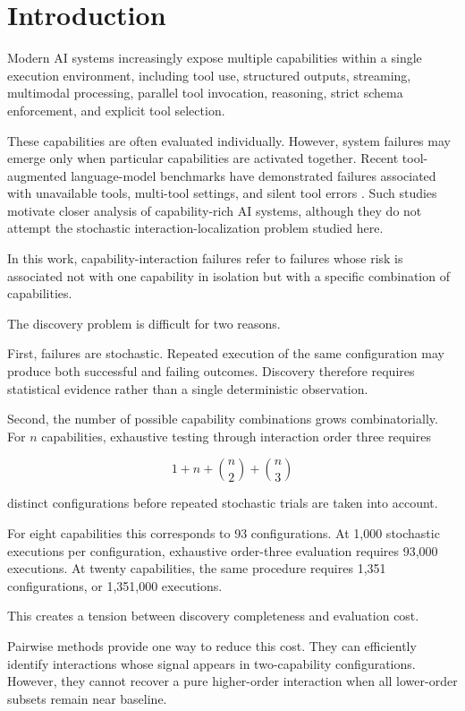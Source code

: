 \section{Introduction}

Modern AI systems increasingly expose multiple capabilities within a single execution environment, including tool use, structured outputs, streaming, multimodal processing, parallel tool invocation, reasoning, strict schema enforcement, and explicit tool selection.

These capabilities are often evaluated individually. However, system failures may emerge only when particular capabilities are activated together. Recent tool-augmented language-model benchmarks have demonstrated failures associated with unavailable tools, multi-tool settings, and silent tool errors \cite{trevino2025failtalms, sun2024toolsfail}. Such studies motivate closer analysis of capability-rich AI systems, although they do not attempt the stochastic interaction-localization problem studied here.

In this work, capability-interaction failures refer to failures whose risk is associated not with one capability in isolation but with a specific combination of capabilities.

The discovery problem is difficult for two reasons.

First, failures are stochastic. Repeated execution of the same configuration may produce both successful and failing outcomes. Discovery therefore requires statistical evidence rather than a single deterministic observation.

Second, the number of possible capability combinations grows combinatorially. For \(n\) capabilities, exhaustive testing through interaction order three requires

\[
1+n+\binom{n}{2}+\binom{n}{3}
\]

distinct configurations before repeated stochastic trials are taken into account.

For eight capabilities this corresponds to 93 configurations. At 1,000 stochastic executions per configuration, exhaustive order-three evaluation requires 93,000 executions. At twenty capabilities, the same procedure requires 1,351 configurations, or 1,351,000 executions.

This creates a tension between discovery completeness and evaluation cost.

Pairwise methods provide one way to reduce this cost. They can efficiently identify interactions whose signal appears in two-capability configurations. However, they cannot recover a pure higher-order interaction when all lower-order subsets remain near baseline.

